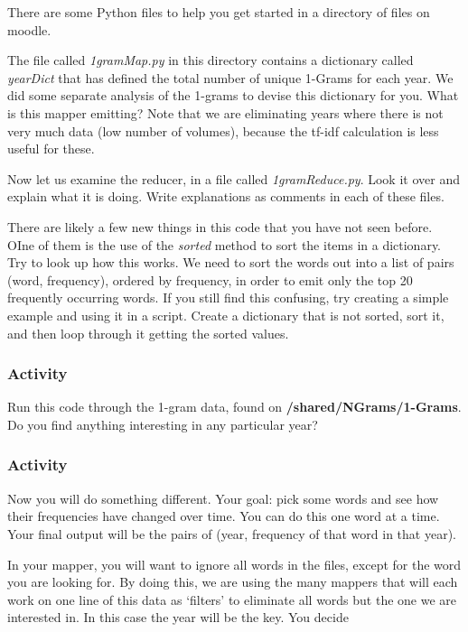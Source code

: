 \documentclass[letterpaper,10pt,openany,oneside]{sphinxmanual}
\begin{document}
There are some Python files to help you get started in a directory
of files on moodle.

The file called \emph{1gramMap.py} in this directory contains a
dictionary called \emph{yearDict} that has defined the total number of
unique 1-Grams for each year. We did some separate analysis of the
1-grams to devise this dictionary for you. What is this mapper
emitting? Note that we are eliminating years where there is not
very much data (low number of volumes), because the tf-idf
calculation is less useful for these.

Now let us examine the reducer, in a file called \emph{1gramReduce.py}.
Look it over and explain what it is doing. Write explanations as
comments in each of these files.

There are likely a few new things in this code that you have not
seen before. OIne of them is the use of the \emph{sorted} method to sort
the items in a dictionary. Try to look up how this works. We need
to sort the words out into a list of pairs (word, frequency),
ordered by frequency, in order to emit only the top 20 frequently
occurring words. If you still find this confusing, try creating a
simple example and using it in a script. Create a dictionary that
is not sorted, sort it, and then loop through it getting the sorted
values.


\subsubsection{Activity}
\label{WmrActivities/WmrActivities:activity}
Run this code through the 1-gram data, found on \textbf{/shared/NGrams/1-Grams}. Do
you find anything interesting in any particular year?


\subsubsection{Activity}
\label{WmrActivities/WmrActivities:id4}
Now you will do something different. Your goal: pick some words and
see how their frequencies have changed over time. You can do this
one word at a time. Your final output will be the pairs of (year,
frequency of that word in that year).

In your mapper, you will want to ignore all words in the files,
except for the word you are looking for. By doing this, we are
using the many mappers that will each work on one line of this data
as `filters' to eliminate all words but the one we are interested
in. In this case the year will be the key. You decide
\end{document}
